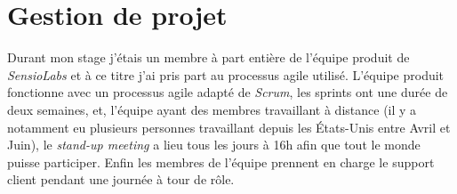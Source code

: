 \chapter{Gestion de projet}

Durant mon stage j'étais un membre à part entière de l'équipe produit de \emph{SensioLabs} et à ce titre j'ai pris part au processus agile utilisé. L'équipe produit fonctionne avec un processus agile adapté de \emph{Scrum}, les sprints ont une durée de deux semaines, et, l'équipe ayant des membres travaillant à distance (il y a notamment eu plusieurs personnes travaillant depuis les États-Unis entre Avril et Juin), le \emph{stand-up meeting} a lieu tous les jours à 16h afin que tout le monde puisse participer. Enfin les membres de l'équipe prennent en charge le support client pendant une journée à tour de rôle.

